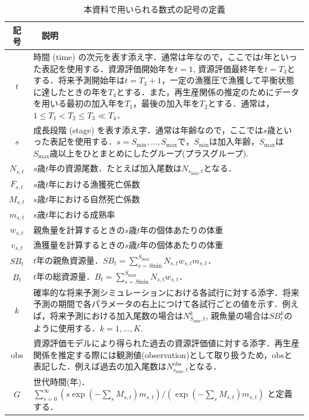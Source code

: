 \documentclass[11pt]{jsarticle}
\begin{document}
\begin{table}[h]
  \caption{本資料で用いられる数式の記号の定義}  
  \begin{tabular}{cp{11cm}} \hline
    記号    & 　説明 \\ \hline
    $t$ & 時間 (time) の次元を表す添え字．通常は年なので，ここでは$t$年といった表記を使用する．資源評価開始年を$t=1$, 資源評価最終年を$t=T_3$とする．将来予測開始年は$t=T_{3}+1$，一定の漁獲圧で漁獲して平衡状態に達したときの年を$T_4$とする．また，再生産関係の推定のためにデータを用いる最初の加入年を$T_1$，最後の加入年を$T_2$とする．通常は，$1 \leq T_1 < T_2 \leq T_3 \ll T_4$．\\
    $s$ & 成長段階 (stage) を表す添え字．通常は年齢なので，ここでは$s$歳といった表記を使用する．$s=S_{\mathrm{min}},...,S_{\mathrm{max}}$で，$S_{\mathrm{min}}$は加入年齢，$S_{\mathrm{max}}$は$S_{\mathrm{max}}$歳以上をひとまとめにしたグループ(プラスグループ).\\ %
    $N_{s,t}$ & $s$歳$t$年の資源尾数．たとえば加入尾数は$N_{s_{\mathrm{min}},t}$となる．\\
    $F_{s,t}$ & $s$歳$t$年における漁獲死亡係数\\
    $M_{s,t}$ & $s$歳$t$年における自然死亡係数\\
    $m_{s,t}$ & $s$歳$t$年における成熟率\\
    $w_{s,t}$ & 親魚量を計算するときの$s$歳$t$年の個体あたりの体重\\
    $v_{s,t}$ & 漁獲量を計算するときの$s$歳$t$年の個体あたりの体重\\ %
    $S\!B_{t} $ & $t$年の親魚資源量．$S\!B_t=\sum_{s=S\mathrm{min}}^{S_{\mathrm{max}}}N_{s,t} w_{s,t} m_{s,t}$．\\
    $B_{t} $ & $t$年の総資源量．$\!B_t=\sum_{s=S\mathrm{min}}^{S_{\mathrm{max}}}N_{s,t} w_{s,t}$．\\    
    $k$      & 確率的な将来予測シミュレーションにおける各試行に対する添字．将来予測の期間で各パラメータの右上につけて各試行ごとの値を示す．例えば，将来予測における加入尾数の場合は$N_{S_{\mathrm{min}},t}^k$, 親魚量の場合は$S\!B_t^k$のように使用する．$k=1,…,K$.\\
    $\mathrm{obs}$  & 資源評価モデルにより得られた過去の資源評価値に対する添字．再生産関係を推定する際には観測値(observation)として取り扱うため，$\mathrm{obs}$と表記した．例えば過去の加入尾数は$N_{s_{\mathrm{min}},t}^{\mathrm{obs}}$となる．\\
    $G$       & 世代時間(年)．$\sum_{s=0}^\infty (s \exp(-\sum_s M_{s,t}) m_{s,t})/(\exp(-\sum_s M_{s,t}) m_{s,t})$ と定義する．\\ %

\end{tabular}
\end{table}
\end{document}
